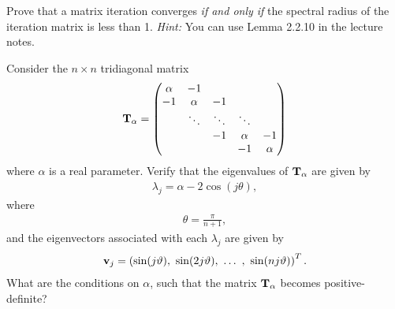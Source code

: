 
\begin{Sheet}
  \label{sheet6}

  \begin{Problem}
    Prove that a matrix iteration converges \textit{if and only if}
    the spectral radius of the iteration matrix is less than 1.
    \textit{Hint:} You can use Lemma 2.2.10 in the lecture notes.
  \end{Problem}

  \begin{Problem}
    \label{sheet6:problem2}
    Consider the $n\times n$ tridiagonal matrix
    \begin{gather*}
      \mathbf T_{\alpha} =
      \begin{pmatrix}
        \alpha &     -1 &        &        & \\
            -1 & \alpha &     -1 &        & \\
               & \ddots & \ddots & \ddots & \\
               &        &     -1 & \alpha &     -1 \\
               &        &        &     -1 & \alpha
      \end{pmatrix}
    \end{gather*}
    where $\alpha$ is a real parameter. Verify that the eigenvalues of
    $\mathbf T_{\alpha}$ are given by
    \begin{gather*}
      \lambda_j = \alpha - 2\cos(j\theta),
    \end{gather*}
    where
    \begin{gather*}
      \theta = \frac\pi{n+1},
    \end{gather*}
    and the eigenvectors associated with each $\lambda_j$ are given by
    \begin{gather*}
      \mathbf v_j = \left(
        \sin(j\vartheta),\ \sin(2j\vartheta),\ \ldots\ ,\ \sin(nj\vartheta)
      \right)^T.
    \end{gather*}
    What are the conditions on $\alpha$, such that the matrix
    $\mathbf T_{\alpha}$ becomes positive-definite?
  \end{Problem}


\end{Sheet}
